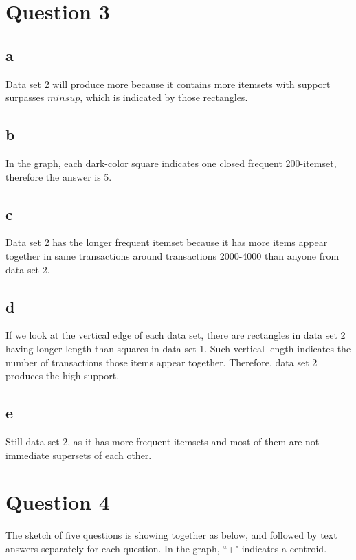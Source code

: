 \documentclass[paper=a4, fontsize=11pt]{scrartcl} %
\begin{document}
\section*{Question 3}

\subsection*{a}

Data set 2 will produce more because it contains more itemsets with support surpasses $minsup$, which is indicated by those rectangles.

\subsection*{b}

In the graph, each dark-color square indicates one closed frequent 200-itemset, therefore the answer is 5.

\subsection*{c}

Data set 2 has the longer frequent itemset because it has more items appear together in same transactions around transactions 2000-4000 than anyone from data set 2.

\subsection*{d}

If we look at the vertical edge of each data set, there are rectangles in data set 2 having longer length than squares in data set 1. Such vertical length indicates the number of transactions those items appear together. Therefore, data set 2 produces the high support.

\subsection*{e}

Still data set 2, as it has more frequent itemsets and most of them are not immediate supersets of each other.

\section*{Question 4}

The sketch of five questions is showing together as below, and followed by text answers separately for each question. In the graph, ``+" indicates a centroid.
\end{document}
